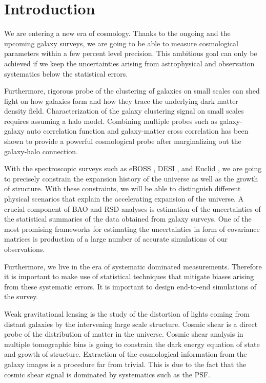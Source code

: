 \chapter*{Introduction}

We are entering a new era of cosmology. Thanks to the ongoing and 
the upcoming galaxy surveys, we are going to be able to measure cosmological 
parameters within a few percent level precision. This ambitious goal 
can only be achieved if we keep the uncertainties arising from 
astrophysical and observation systematics below the statistical errors.
 

Furthermore, rigorous probe of the clustering of galaxies on small scales 
can shed light on how galaxies form and how they trace the underlying dark matter density field.
Characterization of the galaxy clustering signal on small scales requires assuming a halo model. 
Combining multiple probes such as galaxy-galaxy auto correlation function and galaxy-matter cross 
correlation has been shown to provide a powerful cosmological probe after marginalizing out 
the galaxy-halo connection.

With the spectroscopic surveys such as eBOSS \citep{eboss}, DESI , and Euclid \citep{euclid}, 
we are going to precisely constrain the expansion history of the universe as well as the growth of structure. 
With these constraints, we will be able to distinguish different physical scenarios that explain the accelerating expansion of the universe. 
A crucial component of BAO and RSD analyses is estimation of the uncertainties of the statistical summaries of 
the data obtained from galaxy surveys. One of the most promising frameworks for estimating the uncertainties in form of covariance matrices is production 
of a large number of accurate simulations of our observations. 

Furthermore, we live in the era of systematic dominated measurements. 
Therefore it is important to make use of statistical techniques that mitigate 
biases arising from these systematic errors. It is important to design end-to-end simulations of the survey.

Weak gravitational lensing is the study of the distortion of lights coming from distant galaxies by 
the intervening large scale structure. Cosmic shear is a direct probe of the distribution of 
matter in the universe. Cosmic shear analysis in multiple tomographic bins is going to 
constrain the dark energy equation of state and growth of structure. 
Extraction of the cosmological information from the galaxy images is a procedure far from 
trivial. This is due to the fact that the cosmic shear signal is dominated by systematics such as the PSF. 


